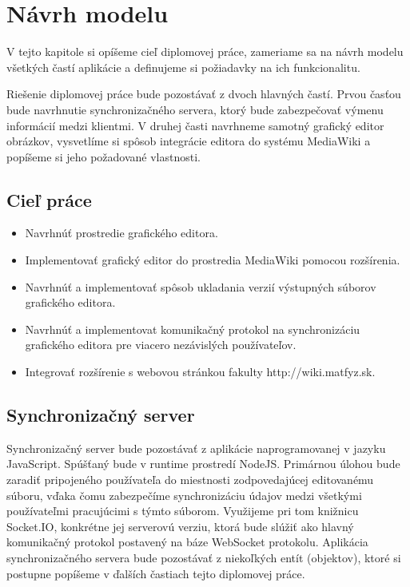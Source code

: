 \chapter{Návrh modelu}\label{chap:proposal}

V tejto kapitole si opíšeme cieľ diplomovej práce, zameriame sa na návrh modelu všetkých častí aplikácie a definujeme si požiadavky na ich funkcionalitu. 

Riešenie diplomovej práce bude pozostávať z dvoch hlavných častí. Prvou časťou bude navrhnutie synchronizačného servera, ktorý bude zabezpečovať výmenu informácií medzi klientmi. V druhej časti navrhneme samotný grafický editor obrázkov, vysvetlíme si spôsob integrácie editora do systému MediaWiki a popíšeme si jeho požadované vlastnosti.

\section{Cieľ práce}
\begin{itemize}
	\item Navrhnúť prostredie grafického editora.
	\item Implementovať grafický editor do prostredia MediaWiki pomocou rozšírenia.
	\item Navrhnúť a implementovať spôsob ukladania verzií výstupných súborov grafického editora.
	\item Navrhnúť a implementovat komunikačný protokol na synchronizáciu grafického editora pre viacero nezávislých používateľov.
	\item Integrovať rozšírenie s webovou stránkou fakulty http://wiki.matfyz.sk.
\end{itemize}

\section{Synchronizačný server}\label{sec:poziadavky_na_server}
Synchronizačný server bude pozostávať z aplikácie naprogramovanej v jazyku JavaScript. Spúšťaný bude v runtime prostredí NodeJS. Primárnou úlohou bude zaradiť pripojeného používateľa do miestnosti zodpovedajúcej editovanému súboru, vďaka čomu zabezpečíme synchronizáciu údajov medzi všetkými používateľmi pracujúcimi s týmto súborom. Využijeme pri tom knižnicu Socket.IO, konkrétne jej serverovú verziu, ktorá bude slúžiť ako hlavný komunikačný protokol postavený na báze WebSocket protokolu. Aplikácia synchronizačného servera bude pozostávať z niekoľkých entít (objektov), ktoré si postupne popíšeme v ďalších častiach tejto diplomovej práce.

